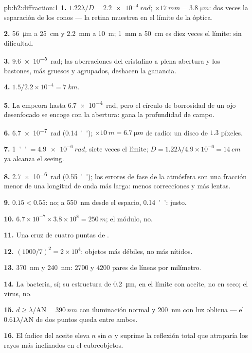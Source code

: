 \begin{solution}{pb:b2:diffraction:1}
\textbf{1.} $1.22\lambda/D = \qty{2.2e-4}{rad}$; $\times\qty{17}{mm} = \qty{3.8}{\micro m}$: dos veces la separación
de los conos --- la retina muestrea en el límite de la óptica.

\textbf{2.} \qty{56}{\micro m} a \qty{25}{cm} y \qty{2.2}{mm} a \qty{10}{m}; \qty{1}{mm} a
\qty{50}{cm} es diez veces el límite: sin dificultad.

\textbf{3.} \qty{9.6e-5}{rad}; las aberraciones del cristalino a plena abertura y los
bastones, más gruesos y agrupados, deshacen la ganancia.

\textbf{4.} $1.5/2.2 \times 10^{-4} = \qty{7}{km}$.

\textbf{5.} La  empeora hasta \qty{6.7e-4}{rad}, pero el círculo de borrosidad de
un ojo desenfocado se encoge con la abertura: gana la profundidad de campo.

\textbf{6.} \qty{6.7e-7}{rad} (\qty{0.14}{''}); $\times\qty{10}{m} = \qty{6.7}{\micro m}$ de radio: un
disco de $1.3$ píxeles.

\textbf{7.} \qty{1}{''} $= \qty{4.9e-6}{rad}$, siete veces el límite; $D = 1.22\lambda/4.9
\times 10^{-6} = \qty{14}{cm}$ ya alcanza el seeing.

\textbf{8.} \qty{2.7e-6}{rad} (\qty{0.55}{''}); los errores de fase de la atmósfera son
una fracción menor de una longitud de onda más larga: menos correcciones y más lentas.

\textbf{9.} $0.15 < 0.55$: no; a \qty{550}{nm} desde el espacio, \qty{0.14}{''}: justo.

\textbf{10.} $6.7 \times 10^{-7} \times 3.8 \times 10^8 = \qty{250}{m}$; el módulo, no.

\textbf{11.} Una cruz de cuatro puntas de .

\textbf{12.} $(1000/7)^2 = 2 \times 10^4$: objetos más débiles, no más nítidos.

\textbf{13.} \qty{370}{nm} y \qty{240}{nm}: $2700$ y $4200$ pares de líneas por
milímetro.

\textbf{14.} La bacteria, sí; su estructura de \qty{0.2}{\micro m}, en el límite
con aceite, no en seco; el virus, no.

\textbf{15.} $d \ge \lambda/\mathrm{AN} = \qty{390}{nm}$ con iluminación normal y \qty{200}{nm}
con luz oblicua --- el $0.61\lambda/\mathrm{AN}$ de dos puntos queda entre ambos.

\textbf{16.} El índice del aceite eleva $n\sin\alpha$ y suprime la reflexión
total que atraparía los rayos más inclinados en el cubreobjetos.


\end{solution}
